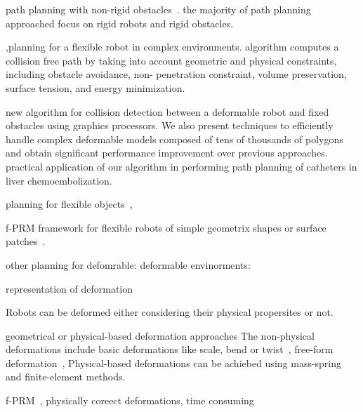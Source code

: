 \documentclass{svmult}
\begin{document}
path planning with non-rigid obstacles~\cite{frank2008efficient}.
the majority of path planning approached focus on rigid robots and rigid obstacles.

\cite{gayle2005path},planning for a flexible robot in complex environments. 
algorithm  computes a collision free path by taking into account geometric and physical constraints, including obstacle avoidance, non-
penetration constraint, volume preservation, surface tension, and energy minimization. 

new algorithm for collision detection between a deformable robot and fixed obstacles using  graphics processors. 
We also present techniques to efficiently handle complex deformable models composed of tens of thousands of polygons and obtain significant performance improvement    over previous approaches. 
practical application of our algorithm in performing path planning of catheters in liver chemoembolization.


planning for flexible objects~\cite{lamiraux2001flexible}, 
 
 f-PRM \cite{kavraki1998towards} framework for flexible robots of simple geometrix shapes\cite{anshelevich2000deformable} or surface patches~\cite{holleman1998planning}.

other planning for defomrable: \cite{anshelevich2000deformable,bayazit2002deformable,gayle2005path}
deformable envinorments: \cite{rodriguez2006planning,frank2008efficient,phillips2014representation}

representation of deformation~\cite{phillips2014representation}
    

Robots can be deformed either considering their physical propersites or not.

geometrical or physical-based deformation approaches
The non-physical deformations include basic deformations  like scale, bend or twist~\cite{barr1984global},
    free-form deformation~\cite{gibson19973d,sederberg1986free},
    Physical-based deformations can be achiebed using mass-spring and finite-element methods.

f-PRM~\cite{anshelevich2000deformable}, physically coreect deformations, time consuming


\end{document}
